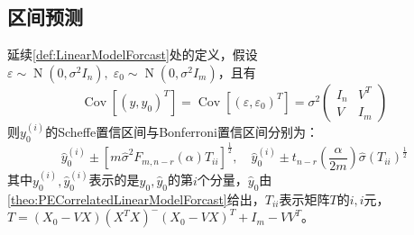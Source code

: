 \subsection{区间预测}
\begin{theorem}
	延续\cref{def:LinearModelForcast}处的定义，假设$\varepsilon\sim\operatorname{N}(0,\sigma^2I_n),\;\varepsilon_0\sim\operatorname{N}(0,\sigma^2I_m)$，且有
	\begin{equation*}
		\operatorname{Cov}[(y,y_0)^T]=\operatorname{Cov}[(\varepsilon,\varepsilon_0)^T]=\sigma^2
		\begin{pmatrix}
			I_n & V^T \\
			V & I_m 
		\end{pmatrix}
	\end{equation*}
	则$y_0^{(i)}$的Scheffe置信区间与Bonferroni置信区间分别为：
	\begin{equation*}
		\hat{y}_0^{(i)}\pm[m\hat{\sigma}^2F_{m,n-r}(\alpha)T_{ii}]^{\frac{1}{2}},\quad
		\hat{y}_0^{(i)}\pm t_{n-r}\left(\frac{\alpha}{2m}\right)\hat{\sigma}(T_{ii})^{\frac{1}{2}}
	\end{equation*}
	其中$y_0^{(i)},\hat{y}_0^{(i)}$表示的是$y_0,\hat{y}_0$的第$i$个分量，$\hat{y}_0$由\cref{theo:PECorrelatedLinearModelForcast}给出，$T_{ii}$表示矩阵$T$的$i,i$元，$T=(X_0-VX)(X^TX)^-(X_0-VX)^T+I_m-VV^T$。
\end{theorem}
